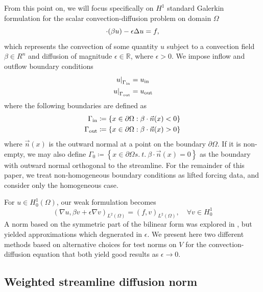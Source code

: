 \documentclass[final,leqno]{siamltex}
\newcommand{\mbb}[1]{\mathbb{#1}}
\newcommand{\LRp}[1]{\left( #1 \right)}
\newcommand{\LRc}[1]{\left\{ #1 \right\}}
\newcommand{\Grad} {\ensuremath{\nabla}}
\renewcommand{\L}{L^2\LRp{\Omega}}
\newcommand{\del}{\Delta}
\let\grad\relax
\newcommand{\grad}{\nabla}
\renewcommand{\div}{\grad \cdot}
\begin{document}
From this point on, we will focus specifically on $H^1$ standard Galerkin formulation for the scalar convection-diffusion problem on domain $\Omega$
\[
\div(\beta u) - \epsilon \del u = f,
\]
which represents the convection of some quantity $u$ subject to a convection field $\beta \in R^n$ and diffusion of magnitude $\epsilon \in \mbb{R}$, where $\epsilon > 0$.  We impose inflow and outflow boundary conditions
\begin{align*}
\left.u\right|_{\Gamma_{\rm in}} &= u_{\rm in}\\
\left.u\right|_{\Gamma_{\rm out}} &= u_{\rm out}
\end{align*}
where the following boundaries are defined as 
\begin{align*}
\Gamma_{\rm in}\coloneqq \LRc{x\in \partial \Omega:  \beta\cdot\vec{n}(x) < 0}\\
\Gamma_{\rm out}\coloneqq \LRc{x\in \partial \Omega: \beta\cdot\vec{n}(x) > 0}
\end{align*}
where $\vec{n}(x)$ is the outward normal at a point on the boundary $\partial \Omega$.  If it is non-empty, we may also define $\Gamma_{0}\coloneqq \LRc{x\in \partial \Omega s.\ t.\ \beta\cdot\vec{n}(x) = 0}$ as the boundary with outward normal orthogonal to the streamline.  For the remainder of this paper, we treat non-homogeneous boundary conditions as lifted forcing data, and consider only the homogeneous case.  

For $u\in H^1_0(\Omega)$, our weak formulation becomes
\[
\LRp{\Grad u,\beta v + \epsilon \Grad v}_{\L} = \LRp{f,v}_{\L}, \quad \forall v \in H^1_0
\]
A norm based on the symmetric part of the bilinear form was explored in \cite{DahmenVariationalStabilization}, but yielded approximations which degnerated in $\epsilon$.  We present here two different methods based on alternative choices for test norms on $V$ for the convection-diffusion equation that both yield good results as $\epsilon\rightarrow 0$.  

\subsection{Weighted streamline diffusion norm}
\end{document}
